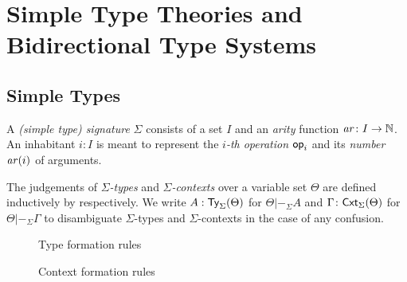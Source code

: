 
\section{Simple Type Theories and Bidirectional Type Systems}\label{sec:defs}

\subsection{Simple Types}
\begin{definition}
  A \emph{(simple type) signature} $\Sigma$ consists of a set $I$ and an \emph{arity} function $\mathit{ar}\colon I \to \mathbb{N}$.
  An inhabitant $i : I$ is meant to represent the \emph{$i$-th operation} $\mathsf{op}_i$ and its \emph{number} $ \mathit{ar}(i)$ of arguments.

  The judgements of \emph{$\Sigma$-types} and \emph{$\Sigma$-contexts} over a variable set $\Theta$ are defined inductively by  respectively.
We write $A : \mathsf{Ty}_{\Sigma}(\Theta)$ for $\Theta |-_{\Sigma} A$ and $\Gamma \colon \mathsf{Cxt}_{\Sigma}(\Theta)$ for $\Theta |-_{\Sigma} \Gamma$ to disambiguate $\Sigma$-types and $\Sigma$-contexts in the case of any confusion.
\end{definition}

\begin{figure}
  \begin{minipage}[b]{.6\textwidth}
    \centering
    \small
    \caption{Type formation rules}
    \label{fig:simple-type}
  \end{minipage}
  \begin{minipage}[b]{.35\textwidth}
    \centering
    \small
    \judgbox{\Theta |-_{\Sigma} \Gamma}{}
    \caption{Context formation rules}
  \label{fig:simple-context}
  \end{minipage}
\end{figure}

